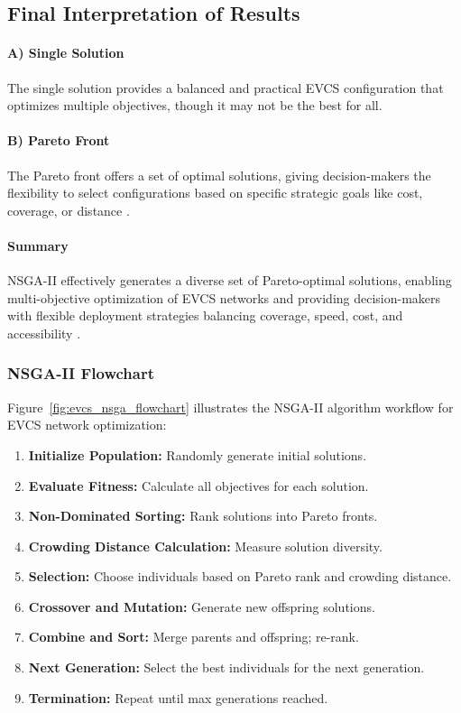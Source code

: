 \subsection*{Final Interpretation of Results}

\paragraph{A) Single Solution}  
The single solution provides a balanced and practical EVCS configuration that optimizes multiple objectives, though it may not be the best for all.

\paragraph{B) Pareto Front}  
The Pareto front offers a set of optimal solutions, giving decision-makers the flexibility to select configurations based on specific strategic goals like cost, coverage, or distance \cite{Introduction_to_evolutionary_computing}.

\paragraph{Summary}  
NSGA-II effectively generates a diverse set of Pareto-optimal solutions, enabling multi-objective optimization of EVCS networks and providing decision-makers with flexible deployment strategies balancing coverage, speed, cost, and accessibility \cite{A_Fast_and_Elitist_Multi_objective_Genetic_Algorithm_NSGA_II}.

\subsubsection*{NSGA-II Flowchart}

Figure~\ref{fig:evcs_nsga_flowchart} illustrates the NSGA-II algorithm workflow for EVCS network optimization:

\begin{enumerate}
    \item \textbf{Initialize Population:} Randomly generate initial solutions.
    \item \textbf{Evaluate Fitness:} Calculate all objectives for each solution.
    \item \textbf{Non-Dominated Sorting:} Rank solutions into Pareto fronts.
    \item \textbf{Crowding Distance Calculation:} Measure solution diversity.
    \item \textbf{Selection:} Choose individuals based on Pareto rank and crowding distance.
    \item \textbf{Crossover and Mutation:} Generate new offspring solutions.
    \item \textbf{Combine and Sort:} Merge parents and offspring; re-rank.
    \item \textbf{Next Generation:} Select the best individuals for the next generation.
    \item \textbf{Termination:} Repeat until max generations reached.
\end{enumerate}

